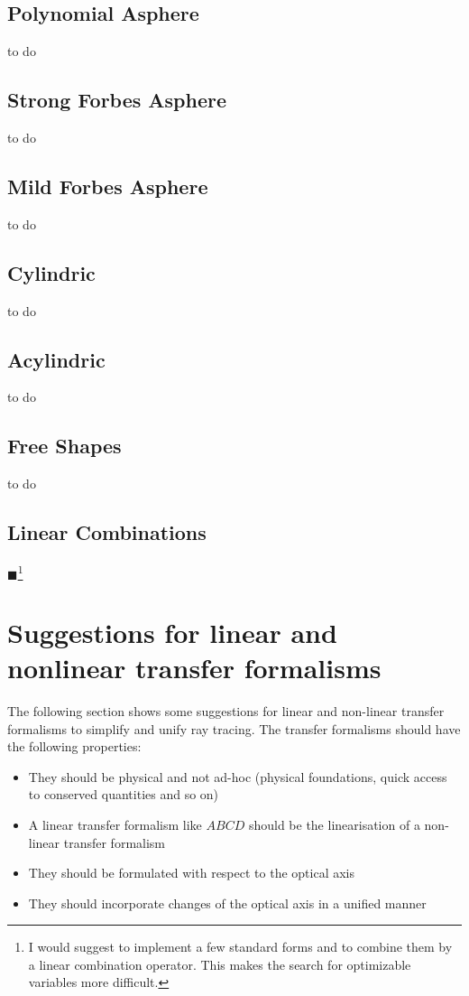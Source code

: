\documentclass[12pt,a4paper,twoside,openright,BCOR10mm,headsepline,titlepage,abstracton,chapterprefix,final]{scrreprt}
\newcommand{\remark}[1]{{\color{red}$\blacksquare$}\footnote{{\color{red}#1}}}
\begin{document}
\subsection{Polynomial Asphere}
to do
\subsection{Strong Forbes Asphere}
to do
\subsection{Mild Forbes Asphere}
to do
\subsection{Cylindric}
to do
\subsection{Acylindric}
to do
\subsection{Free Shapes}
to do

\subsection{Linear Combinations}
\remark{I would suggest to implement a few standard forms and to combine them by a linear combination operator. This makes the search for optimizable
variables more difficult.}

\section{Suggestions for linear and nonlinear transfer formalisms}
The following section shows some suggestions for linear and non-linear transfer formalisms
to simplify and unify ray tracing. The transfer formalisms should have the following properties:

\begin{itemize}
 \item They should be physical and not ad-hoc (physical foundations, quick access to conserved quantities and so on)
 \item A linear transfer formalism like $ABCD$ should be the linearisation of a non-linear transfer formalism
 \item They should be formulated with respect to the optical axis
 \item They should incorporate changes of the optical axis in a unified manner
\end{itemize}
\end{document}
